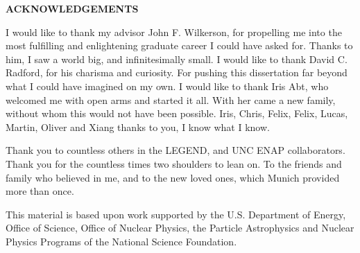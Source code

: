 
\begin{center}
\vspace*{52pt}
{\normalfont \textbf{ACKNOWLEDGEMENTS}}
\end{center}

I would like to thank my advisor John F. Wilkerson, for propelling me into the most fulfilling and enlightening graduate career I could have asked for. Thanks to him, I saw a world big, and infinitesimally small. I would like to thank David C. Radford, for his charisma and curiosity. For pushing this dissertation far beyond what I could have imagined on my own. I would like to thank Iris Abt, who welcomed me with open arms and started it all. With her came a new family, without whom this would not have been possible. Iris, Chris, Felix, Felix, Lucas, Martin, Oliver and Xiang thanks to you, I know what I know.

Thank you to countless others in the LEGEND, {\MJMit} and UNC ENAP collaborators. Thank you for the countless times two shoulders to lean on. To the friends and family who believed in me, and to the new loved ones, which Munich provided more than once. 

This material is based upon work supported by the U.S. Department of Energy, Office of Science, Office of Nuclear Physics, the Particle Astrophysics and Nuclear Physics Programs of the National Science Foundation.

\clearpage
